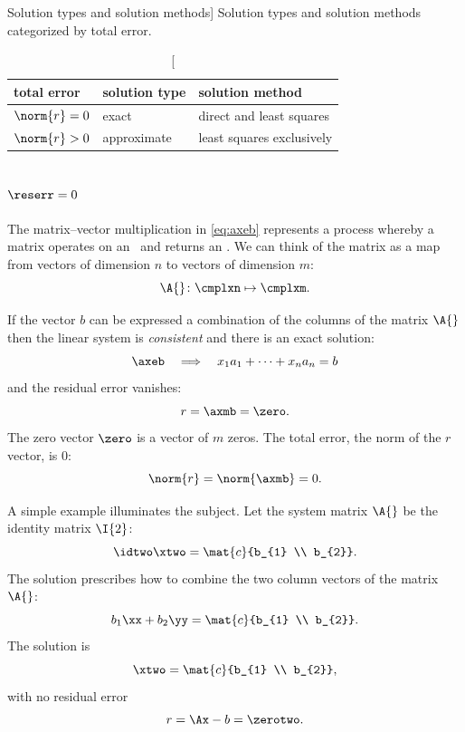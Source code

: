\begin{table}[htp]
\caption
[Solution types and solution methods]
{Solution types and solution methods categorized by total error.}
	\begin{center}
		\begin{tabular}{lll}
			total error & solution type & solution method \\\hline
			$\norm{r} = 0$ & exact  & direct and least squares \\
			$\norm{r} > 0$ & approximate & least squares exclusively\\
		\end{tabular}
	\end{center}
\label{tab:Solution types and solution methods}
\end{table}%

%
\subsection{\label{sec:image space}$\reserr = 0$}  
The matrix--vector multiplication in \eqref{eq:axeb} represents a process whereby a matrix operates on an \nv\ and returns an \mv. We can think of the matrix as a map from vectors of dimension $n$ to vectors of dimension $m$:
%
\begin{equation*}
	\A{} \colon \cmplxn \mapsto \cmplxm .
\end{equation*}

If the vector $b$ can be expressed a combination of the columns of the matrix $\A{}$ then the linear system is \emph{consistent} and there is an exact solution:
%
\begin{equation*}
	\axeb \quad \Longrightarrow \quad x_{1} a_{1} + \cdots + x_{n} a_{n} = b
\end{equation*}
%
and the residual error  vanishes:
%
\begin{equation*}
	r = \axmb = \zero.
\label{eq:axmb}
\end{equation*}
%
The zero vector $\zero$ is a vector of $m$ zeros. The total error, the norm of the $r$ vector, is 0:
%
\begin{equation*}
	\norm{r} = \norm{\axmb} = 0.
\end{equation*}

A simple example illuminates the subject. Let the system matrix $\A{}$ be the identity matrix $\I{2}$:
\begin{equation*}
	\idtwo \xtwo = \mat{c}{b_{1} \\ b_{2}}.
\end{equation*}
The solution prescribes how to combine the two column vectors of the matrix $\A{}$:
%
\begin{equation*}
	b_{1} \xx + b_{2} \yy = \mat{c}{b_{1} \\ b_{2}}.
\end{equation*}
%
The solution is
%
\begin{equation*}
	\xtwo = \mat{c}{b_{1} \\ b_{2}},
\end{equation*}
with no residual error 
%
\begin{equation}
	r = \Ax - b = \zerotwo .
\label{eq:consistent}
\end{equation}
%
